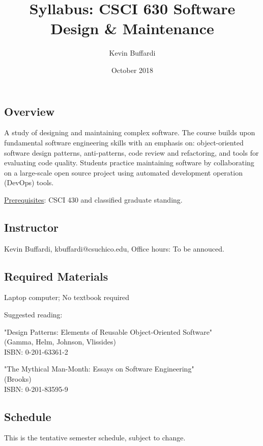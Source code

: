 \documentclass[12pt]{article}
\title{Syllabus: CSCI 630 Software Design \& Maintenance}
\author{Kevin Buffardi}
\date{October 2018}
\begin{document}
  \maketitle
  \subsection*{Overview}	 
  \noindent
  A study of designing and maintaining complex software. The course builds upon fundamental software engineering skills with an emphasis on: object-oriented software design patterns, anti-patterns, code review and refactoring, and tools for evaluating code quality. Students practice maintaining software by collaborating on a large-scale open source project using automated development operation (DevOps) tools.

  \underline{Prerequisites}: CSCI 430 and classified graduate standing.
  
  \subsection*{Instructor}
  \noindent
  Kevin Buffardi, kbuffardi@csuchico.edu, Office hours: To be annouced.

  \subsection*{Required Materials}
  \noindent
  Laptop computer; No textbook required

  Suggested reading: 
  
  \smallskip
  "Design Patterns: Elements of Reusable Object-Oriented Software"\\
  (Gamma, Helm, Johnson, Vlissides)\\
  ISBN: 0-201-63361-2
  
  \smallskip
  "The Mythical Man-Month: Essays on Software Engineering"\\
  (Brooks)\\
  ISBN: 0-201-83595-9

  \subsection*{Schedule}
  \noindent
  This is the tentative semester schedule, subject to change.
\end{document}

